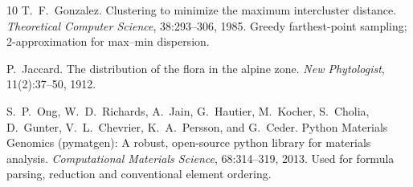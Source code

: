 \documentclass[11pt,a4paper]{article}
\begin{document}
\begin{thebibliography}{10}
T.~F.~Gonzalez.
\newblock Clustering to minimize the maximum intercluster distance.
\newblock \emph{Theoretical Computer Science}, 38:293--306, 1985.
\newblock {}
\newblock Greedy farthest-point sampling; 2-approximation for max--min dispersion.

P.~Jaccard.
\newblock The distribution of the flora in the alpine zone.
\newblock \emph{New Phytologist}, 11(2):37--50, 1912.
\newblock {}

S.~P.~Ong, W.~D.~Richards, A.~Jain, G.~Hautier, M.~Kocher, S.~Cholia, D.~Gunter, V.~L.~Chevrier,
K.~A.~Persson, and G.~Ceder.
\newblock Python Materials Genomics (pymatgen): A robust, open-source python library for materials
analysis.
\newblock \emph{Computational Materials Science}, 68:314--319, 2013.
\newblock {}
\newblock Used for formula parsing, reduction and conventional element ordering.

\end{thebibliography}
\end{document}
